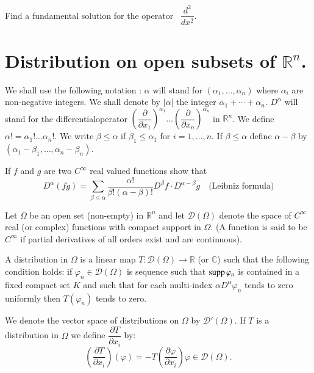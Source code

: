 \begin{exer*}
Find a fundamental solution for the operator \ $\dfrac{d^{2}}{dx^{2}}$.
\end{exer*}

\section*{Distribution on open subsets of $\mathbb{R}^{n}$.}

We shall use the following notation : $\alpha$ will stand for $(\alpha_{1},\ldots,\alpha_{n})$ where $\alpha_{i}$ are non-negative integers. We shall denote by $|\alpha|$ the integer $\alpha_{1}+\cdots+\alpha_{n}$. $D^{\alpha}$ will stand for the differential\pageoriginale operator $\left(\dfrac{\partial}{\partial x_{1}}\right)^{\alpha_{1}}\ldots \left(\dfrac{\partial}{\partial x_{n}}\right)^{\alpha_{n}}$ in $\mathbb{R}^{n}$. We define $\alpha!=\alpha_{1}!\ldots \alpha_{n}!$. We write $\beta \leq \alpha$ if $\beta_{1}\leq \alpha_{1}$ for $i=1,\ldots,n$. If $\beta\leq \alpha$ define $\alpha-\beta$ by $(\alpha_{1}-\beta_{1},\ldots,\alpha_{n}-\beta_{n})$.

\begin{exer*}
If $f$ and $g$ are two $C^{\infty}$ real valued functions show that
$$
D^{\alpha}(fg)=\sum\limits_{\beta\leq \alpha}\frac{\alpha!}{\beta!(\alpha-\beta)!}D^{\beta}f\cdot D^{\alpha-\beta}g\quad \text{(Leibniz formula)}
$$
\end{exer*}

Let $\Omega$ be an open set (non-empty) in $\mathbb{R}^{n}$ and let $\mathcal{D}(\Omega)$ denote the space of $C^{\infty}$ real (or complex) functions with compact support in $\Omega$. (A function is said to be $C^{\infty}$ if partial derivatives of all orders exist and are continuous).

\begin{defi*}
A distribution in $\Omega$ is a linear map $T:\mathcal{D}(\Omega)\to \mathbb{R}$ (or $\mathbb{C}$) such that the following condition holds: if $\varphi_{n}\in \mathcal{D}(\Omega)$ is sequence such that $\operatorname{supp} \varphi_{n}$ is contained in a fixed compact set $K$ and such that for each multi-index $\alpha D^{\alpha}\varphi_{n}$ tends to zero uniformly then $T(\varphi_{n})$ tends to zero.
\end{defi*}

We denote the vector space of distributions on $\Omega$ by $\mathcal{D}'(\Omega)$. If $T$ is a distribution in $\Omega$ we define $\dfrac{\partial T}{\partial x_{i}}$ by:
$$
\left(\dfrac{\partial T}{\partial x_{i}}\right)(\varphi)=-T\left(\dfrac{\partial \varphi}{\partial x_{i}}\right)\varphi \in \mathcal{D}(\Omega).
$$

